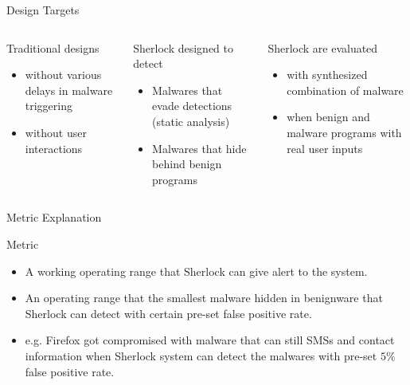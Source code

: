 \documentclass{beamer}
\begin{document}
\begin{frame}{Design Targets}
	\begin{columns}
		\begin{block}{Traditional designs}
			\begin{itemize}
				\item without various delays in malware triggering
				\item without user interactions
			\end{itemize}
		\end{block}
\pause
		\begin{block}{Sherlock designed to detect}
			\begin{itemize}
				\item Malwares that evade detections (static analysis)
				\item Malwares that hide behind benign programs
			\end{itemize}
		\end{block}
\pause

		\begin{block}{Sherlock are evaluated}
			\begin{itemize}
				\item with synthesized combination of malware
				\item when benign and malware programs with real user inputs
			\end{itemize}
		\end{block}
	\end{columns}
\end{frame}

\begin{frame}{Metric Explanation}
	\begin{block}{Metric}
		\begin{itemize}
			\item A working operating range that Sherlock can give alert to the
				system.
\pause
			\item An operating range that the smallest malware hidden in
				benignware that Sherlock can detect with certain pre-set false
				positive rate.
\pause
			\item e.g. Firefox got compromised with malware that can still SMSs 
				and contact information when Sherlock system can detect the malwares 
				with pre-set $5\%$ false positive rate.
		\end{itemize}
	\end{block}
\end{frame}
\end{document}
